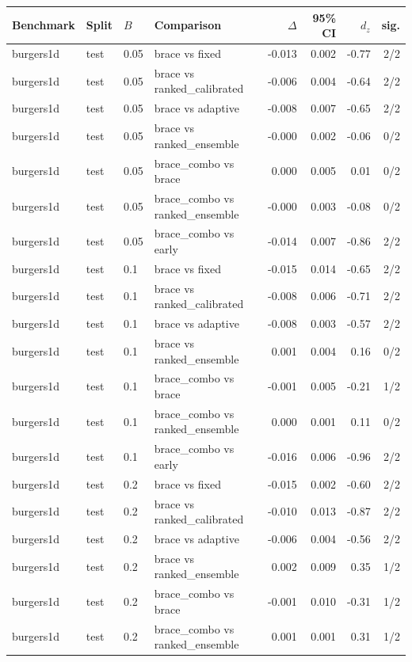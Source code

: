 \begin{tabular}{llllrrrr}
\toprule
Benchmark & Split & $B$ & Comparison & $\Delta$ & 95\% CI & $d_z$ & sig. \\
\midrule
burgers1d & test & 0.05 & brace vs fixed & -0.013 & 0.002 & -0.77 & 2/2 \\
burgers1d & test & 0.05 & brace vs ranked\_calibrated & -0.006 & 0.004 & -0.64 & 2/2 \\
burgers1d & test & 0.05 & brace vs adaptive & -0.008 & 0.007 & -0.65 & 2/2 \\
burgers1d & test & 0.05 & brace vs ranked\_ensemble & -0.000 & 0.002 & -0.06 & 0/2 \\
burgers1d & test & 0.05 & brace\_combo vs brace & 0.000 & 0.005 & 0.01 & 0/2 \\
burgers1d & test & 0.05 & brace\_combo vs ranked\_ensemble & -0.000 & 0.003 & -0.08 & 0/2 \\
burgers1d & test & 0.05 & brace\_combo vs early & -0.014 & 0.007 & -0.86 & 2/2 \\
burgers1d & test & 0.1 & brace vs fixed & -0.015 & 0.014 & -0.65 & 2/2 \\
burgers1d & test & 0.1 & brace vs ranked\_calibrated & -0.008 & 0.006 & -0.71 & 2/2 \\
burgers1d & test & 0.1 & brace vs adaptive & -0.008 & 0.003 & -0.57 & 2/2 \\
burgers1d & test & 0.1 & brace vs ranked\_ensemble & 0.001 & 0.004 & 0.16 & 0/2 \\
burgers1d & test & 0.1 & brace\_combo vs brace & -0.001 & 0.005 & -0.21 & 1/2 \\
burgers1d & test & 0.1 & brace\_combo vs ranked\_ensemble & 0.000 & 0.001 & 0.11 & 0/2 \\
burgers1d & test & 0.1 & brace\_combo vs early & -0.016 & 0.006 & -0.96 & 2/2 \\
burgers1d & test & 0.2 & brace vs fixed & -0.015 & 0.002 & -0.60 & 2/2 \\
burgers1d & test & 0.2 & brace vs ranked\_calibrated & -0.010 & 0.013 & -0.87 & 2/2 \\
burgers1d & test & 0.2 & brace vs adaptive & -0.006 & 0.004 & -0.56 & 2/2 \\
burgers1d & test & 0.2 & brace vs ranked\_ensemble & 0.002 & 0.009 & 0.35 & 1/2 \\
burgers1d & test & 0.2 & brace\_combo vs brace & -0.001 & 0.010 & -0.31 & 1/2 \\
burgers1d & test & 0.2 & brace\_combo vs ranked\_ensemble & 0.001 & 0.001 & 0.31 & 1/2 \\

\end{tabular}
